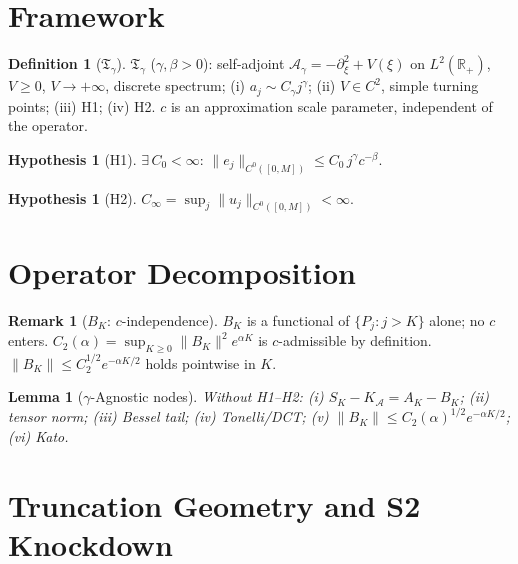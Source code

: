 \documentclass[12pt,a4paper]{amsart}
\newtheorem{lemma}[theorem]{Lemma}
\theoremstyle{definition}
\newtheorem{definition}[theorem]{Definition}
\newtheorem{hypothesis}[theorem]{Hypothesis}
\newtheorem{remark}[theorem]{Remark}
\newcommand{\cA}{\mathcal{A}}
\newcommand{\cAg}{\mathcal{A}_\gamma}
\newcommand{\R}{\mathbb{R}}
\newcommand{\cKA}{K_{\cA}}
\newcommand{\SK}{S_K}
\newcommand{\AK}{A_K}
\newcommand{\BK}{B_K}
\begin{document}
\section{Framework}
\label{sec:framework}

\begin{definition}[$\mathfrak{T}_\gamma$]
\label{def:opclass}
$\mathfrak{T}_\gamma$ ($\gamma,\beta>0$): self-adjoint
$\cAg=-\partial_\xi^2+V(\xi)$ on $L^2(\R_+)$,
$V\geq 0$, $V\to+\infty$, discrete spectrum;
(i) $a_j\sim C_\gamma j^\gamma$;
(ii) $V\in C^2$, simple turning points; (iii) H1; (iv) H2.
$c$ is an approximation scale parameter, independent of the operator.
\end{definition}

\begin{hypothesis}[H1]
\label{hyp:langer_pointwise}
$\exists\,C_0<\infty$:
$\|e_j\|_{C^0([0,M])}\leq C_0\,j^\gamma c^{-\beta}$.
\end{hypothesis}

\begin{hypothesis}[H2]
\label{hyp:Cinfty}
$C_\infty=\sup_{j}\|u_j\|_{C^0([0,M])}<\infty$.
\end{hypothesis}

\section{Operator Decomposition}
\label{sec:opdecomp}

\begin{remark}[$\BK$: $c$-independence]
\label{rem:BK_definition}
$\BK$ is a functional of $\{P_j:j>K\}$ alone; no $c$ enters.
$C_2(\alpha)=\sup_{K\geq 0}\|\BK\|^2 e^{\alpha K}$
is $c$-admissible by definition.
$\|\BK\|\leq C_2^{1/2}e^{-\alpha K/2}$ holds pointwise in $K$.
\end{remark}

\begin{lemma}[$\gamma$-Agnostic nodes]
\label{lem:gamma_agnostic}
Without H1--H2:
(i) $\SK-\cKA=\AK-\BK$;
(ii) tensor norm; (iii) Bessel tail; (iv) Tonelli/DCT;
(v) $\|\BK\|\leq C_2(\alpha)^{1/2}e^{-\alpha K/2}$;
(vi) Kato.
\end{lemma}

\section{Truncation Geometry and S2 Knockdown}
\label{sec:trunc}
\end{document}
